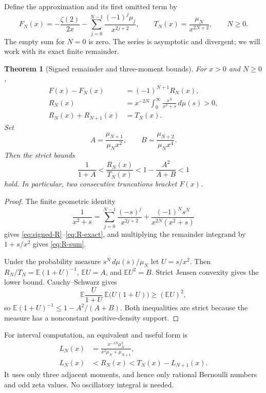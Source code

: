 \documentclass[11pt]{article}
\numberwithin{equation}{section}
\newtheorem{theorem}{Theorem}[section]
\theoremstyle{definition}
\theoremstyle{remark}
\newcommand{\E}{\mathbb E}
\begin{document}
Define the approximation and its first omitted term by
\begin{equation}\label{eq:FN}
 F_N(x)=-\frac{\zeta(2)}{2x}
         -\sum_{j=0}^{N-1}\frac{(-1)^j\mu_j}{x^{2j+2}},
 \qquad T_N(x)=\frac{\mu_N}{x^{2N+2}},
 \qquad N\ge0.
\end{equation}
The empty sum for $N=0$ is zero. The series is asymptotic and divergent;
we will work with its exact finite remainder.

\begin{theorem}[Signed remainder and three-moment bounds]
\label{thm:remainder}
For $x>0$ and $N\ge0$,
\begin{align}
 F(x)-F_N(x)&=(-1)^{N+1}R_N(x),\label{eq:signed-R}\\
 R_N(x)&=x^{-2N}\int_0^\infty\frac{s^N}{x^2+s}\,d\mu(s)>0,
 \label{eq:R-exact}\\
 R_N(x)+R_{N+1}(x)&=T_N(x).\label{eq:R-sum}
\end{align}
Set
\[
 A=\frac{\mu_{N+1}}{\mu_Nx^2},\qquad
 B=\frac{\mu_{N+2}}{\mu_Nx^4}.
\]
Then the strict bounds
\begin{equation}\label{eq:three-moment}
 \frac1{1+A}<\frac{R_N(x)}{T_N(x)}
       <1-\frac{A^2}{A+B}<1
\end{equation}
hold. In particular, two consecutive truncations bracket $F(x)$.
\end{theorem}
\begin{proof}
The finite geometric identity
\[
 \frac1{x^2+s}
 =\sum_{j=0}^{N-1}\frac{(-s)^j}{x^{2j+2}}
    +\frac{(-1)^Ns^N}{x^{2N}(x^2+s)}
\]
gives \eqref{eq:signed-R}--\eqref{eq:R-exact}, and multiplying the
remainder integrand by $1+s/x^2$ gives \eqref{eq:R-sum}.

Under the probability measure $s^N\,d\mu(s)/\mu_N$ let $U=s/x^2$.
Then $R_N/T_N=\E(1+U)^{-1}$, $\E U=A$, and $\E U^2=B$.
Strict Jensen convexity gives the lower bound. Cauchy--Schwarz gives
\[
 \E\frac{U}{1+U}\ \E\bigl(U(1+U)\bigr)\ge(\E U)^2,
\]
so $\E(1+U)^{-1}\le1-A^2/(A+B)$. Both inequalities are strict
because the measure has a nonconstant positive-density support.
\end{proof}

For interval computation, an equivalent and useful form is
\begin{align}
 L_N(x)&=\frac{x^{-2N}\mu_N^2}{x^2\mu_N+\mu_{N+1}},\nonumber\\
 L_N(x)&<R_N(x)<T_N(x)-L_{N+1}(x).
 \label{eq:interval-R}
\end{align}
It uses only three adjacent moments, and hence only rational
Bernoulli numbers and odd zeta values. No oscillatory integral is needed.
\end{document}
